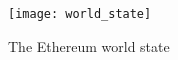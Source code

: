 \begin{figure}[H]
    \centering
    \texttt{[image: world\_state]}
    \caption{The Ethereum world state~\cite{vitalik}}
    \label{fig:worldstate}
\end{figure}